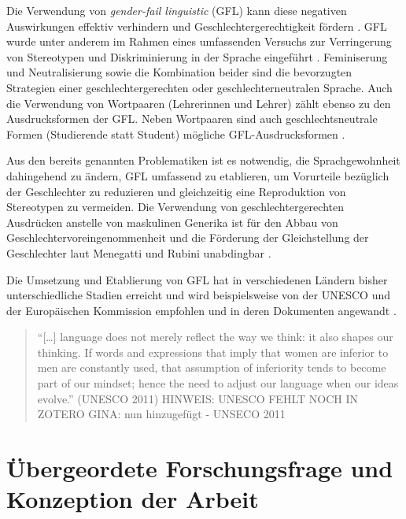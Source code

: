 \documentclass[12pt, 
    twoside=false, 
    bibliography=totoc, 
    numbers=endperiod, 
    headings=normal, 
    toc=chapterentrydotfill
    ]{scrbook}
\begin{document}
Die Verwendung von \emph{gender-fail linguistic} (GFL) kann diese negativen Auswirkungen effektiv verhindern und Geschlechtergerechtigkeit fördern \parencite[1]{menegatti_2017}. GFL wurde unter anderem im Rahmen eines umfassenden Versuchs zur Verringerung von Stereotypen und Diskriminierung in der Sprache eingeführt \parencite[2]{sczesny_2016}. Feminiserung und Neutralisierung sowie die Kombination beider sind die bevorzugten Strategien einer geschlechtergerechten oder geschlechterneutralen Sprache. Auch die Verwendung von Wortpaaren (Lehrerinnen und Lehrer) zählt ebenso zu den Ausdrucksformen der GFL. Neben Wortpaaren sind auch geschlechtsneutrale Formen (Studierende statt Student) mögliche GFL-Ausdrucksformen \parencite[2]{sczesny_2016}.

Aus den bereits genannten Problematiken ist es notwendig, die Sprachgewohnheit dahingehend zu ändern, GFL umfassend zu etablieren, um Vorurteile bezüglich der Geschlechter zu reduzieren und gleichzeitig eine Reproduktion von Stereotypen zu vermeiden. Die Verwendung von geschlechtergerechten Ausdrücken anstelle von maskulinen Generika ist für den Abbau von Geschlechtervoreingenommenheit und die Förderung der Gleichstellung der Geschlechter laut Menegatti und Rubini unabdingbar \parencite*{menegatti_2017}.

Die Umsetzung und Etablierung von GFL hat in verschiedenen Ländern bisher unterschiedliche Stadien erreicht und wird beispielsweise von der UNESCO und der Europäischen Kommission empfohlen und in deren Dokumenten angewandt \parencite[4]{sczesny_2016}.

\begin{quote}
    \enquote{[…] language does not merely reflect the way we think: it also shapes our thinking. If words and expressions that imply that women are inferior to men are constantly used, that assumption of inferiority tends to become part of our mindset; hence the need to adjust our language when our ideas evolve.} (UNESCO 2011) HINWEIS: UNESCO FEHLT NOCH IN ZOTERO GINA: nun hinzugefügt - UNSECO 2011
\end{quote}




\chapter{Übergeordete Forschungsfrage und Konzeption der Arbeit}
\end{document}
